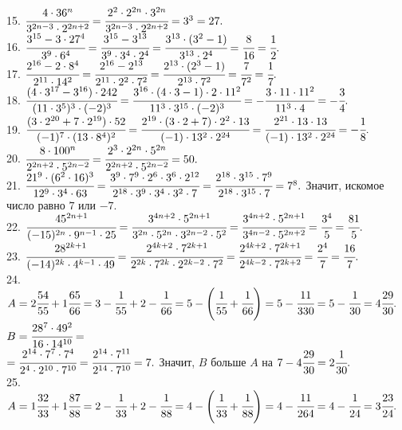 15. $\cfrac{4\cdot36^n}{3^{2n-3}\cdot2^{2n+2}}=\cfrac{2^2\cdot2^{2n}\cdot3^{2n}}{3^{2n-3}\cdot2^{2n+2}}=3^3=27.$\\
16. $\cfrac{3^{15}-3\cdot27^4}{3^9\cdot6^4}=\cfrac{3^{15}-3^{13}}{3^9\cdot3^4\cdot2^4}=\cfrac{3^{13}\cdot(3^2-1)}{3^{13}\cdot2^4}=\cfrac{8}{16}=\cfrac{1}{2}.$\\
17. $\cfrac{2^{16}-2\cdot 8^4}{2^{11}\cdot 14^2}=\cfrac{2^{16}-2^{13}}{2^{11}\cdot 2^2\cdot7^2}=\cfrac{2^{13}\cdot(2^3-1)}{2^{13}\cdot7^2}=\cfrac{7}{7^2}=\cfrac{1}{7}.$\\
18. $\cfrac{(4\cdot3^{17}-3^{16})\cdot242}{(11\cdot 3^5)^3\cdot(-2)^3}=\cfrac{3^{16}\cdot(4\cdot3-1)\cdot2\cdot11^2}{11^3\cdot 3^{15}\cdot(-2)^3}=
-\cfrac{3\cdot11\cdot11^2}{11^3\cdot4}=-\cfrac{3}{4}.$\\
19. $\cfrac{(3\cdot 2^{20}+7\cdot 2^{19})\cdot 52}{(-1)^7\cdot(13\cdot8^4)^2}=\cfrac{2^{19}\cdot(3\cdot2+7)\cdot 2^2\cdot13}{(-1)\cdot13^2\cdot2^{24}}=
\cfrac{2^{21}\cdot13\cdot13}{(-1)\cdot13^2\cdot2^{24}}=-\cfrac{1}{8}.$\\
20. $\cfrac{8\cdot100^n}{2^{2n+2}\cdot5^{2n-2}}=\cfrac{2^3\cdot2^{2n}\cdot5^{2n}}{2^{2n+2}\cdot5^{2n-2}}=50.$\\
21. $\cfrac{21^9\cdot(6^2\cdot16)^3}{12^9\cdot3^4\cdot63}=\cfrac{3^9\cdot7^9\cdot2^6\cdot3^6\cdot2^{12}}{2^{18}\cdot3^9\cdot3^4\cdot3^2\cdot7}=
\cfrac{2^{18}\cdot3^{15}\cdot7^9}{2^{18}\cdot3^{15}\cdot7}=7^8.$ Значит, искомое число равно $7$ или $-7.$\\
22. $\cfrac{45^{2n+1}}{(-15)^{2n}\cdot 9^{n-1}\cdot25}=\cfrac{3^{4n+2}\cdot5^{2n+1}}{3^{2n}\cdot5^{2n}\cdot 3^{2n-2}\cdot5^2}=
\cfrac{3^{4n+2}\cdot5^{2n+1}}{3^{4n-2}\cdot5^{2n+2}}=\cfrac{3^4}{5}=\cfrac{81}{5}.$\\
23. $\cfrac{28^{2k+1}}{(-14)^{2k}\cdot4^{k-1}\cdot49}=\cfrac{2^{4k+2}\cdot7^{2k+1}}{2^{2k}\cdot7^{2k}\cdot2^{2k-2}\cdot7^2}=
\cfrac{2^{4k+2}\cdot7^{2k+1}}{2^{4k-2}\cdot7^{2k+2}}=\cfrac{2^4}{7}=\cfrac{16}{7}.$\\
24. $A=2\cfrac{54}{55}+1\cfrac{65}{66}=3-\cfrac{1}{55}+2-\cfrac{1}{66}=5-\left(\cfrac{1}{55}+\cfrac{1}{66}\right)=5-\cfrac{11}{330}=5-\cfrac{1}{30}=4\cfrac{29}{30}.$
$B=\cfrac{28^7\cdot49^2}{16\cdot14^{10}}=$\\$=\cfrac{2^{14}\cdot7^{7}\cdot7^4}{2^4\cdot2^{10}\cdot7^{10}}=\cfrac{2^{14}\cdot7^{11}}{2^{14}\cdot7^{10}}=7.$ Значит, $B$ больше $A$ на $7-4\cfrac{29}{30}=2\cfrac{1}{30}.$\\
25. $A=1\cfrac{32}{33}+1\cfrac{87}{88}=2-\cfrac{1}{33}+2-\cfrac{1}{88}=4-\left(\cfrac{1}{33}+\cfrac{1}{88}\right)=4-\cfrac{11}{264}=4-\cfrac{1}{24}=3\cfrac{23}{24}.$

